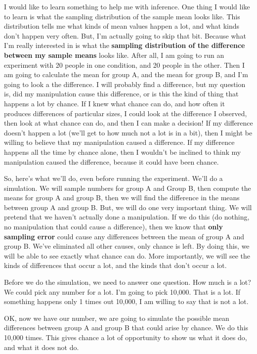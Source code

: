 \documentclass[
]{book}
\begin{document}
I would like to learn something to help me with inference. One thing I would like to learn is what the sampling distribution of the sample mean looks like. This distribution tells me what kinds of mean values happen a lot, and what kinds don't happen very often. But, I'm actually going to skip that bit. Because what I'm really interested in is what the \textbf{sampling distribution of the difference between my sample means} looks like. After all, I am going to run an experiment with 20 people in one condition, and 20 people in the other. Then I am going to calculate the mean for group A, and the mean for group B, and I'm going to look a the difference. I will probably find a difference, but my question is, did my manipulation cause this difference, or is this the kind of thing that happens a lot by chance. If I knew what chance can do, and how often it produces differences of particular sizes, I could look at the difference I observed, then look at what chance can do, and then I can make a decision! If my difference doesn't happen a lot (we'll get to how much not a lot is in a bit), then I might be willing to believe that my manipulation caused a difference. If my difference happens all the time by chance alone, then I wouldn't be inclined to think my manipulation caused the difference, because it could have been chance.

So, here's what we'll do, even before running the experiment. We'll do a simulation. We will sample numbers for group A and Group B, then compute the means for group A and group B, then we will find the difference in the means between group A and group B. But, we will do one very important thing. We will pretend that we haven't actually done a manipulation. If we do this (do nothing, no manipulation that could cause a difference), then we know that \textbf{only sampling error} could cause any differences between the mean of group A and group B. We've eliminated all other causes, only chance is left. By doing this, we will be able to see exactly what chance can do. More importantly, we will see the kinds of differences that occur a lot, and the kinds that don't occur a lot.

Before we do the simulation, we need to answer one question. How much is a lot? We could pick any number for a lot. I'm going to pick 10,000. That is a lot. If something happens only 1 times out 10,000, I am willing to say that is not a lot.

OK, now we have our number, we are going to simulate the possible mean differences between group A and group B that could arise by chance. We do this 10,000 times. This gives chance a lot of opportunity to show us what it does do, and what it does not do.
\end{document}
